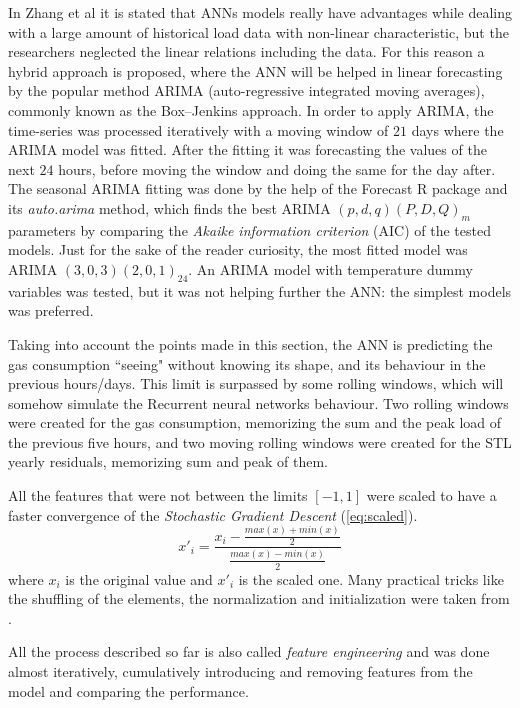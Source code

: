 \documentclass{sig-alternate-sigmod07}
\begin{document}
In Zhang et al \cite{zhang1998forecasting} it is stated that ANNs models really have advantages while dealing with a large amount of historical load data with non-linear characteristic, but the researchers neglected the linear relations including the data. For this reason a hybrid approach is proposed, where the ANN will be helped in linear forecasting by the popular method ARIMA (auto-regressive integrated moving averages), commonly known as the Box–Jenkins approach. In order to apply ARIMA, the time-series was processed iteratively with a moving window of $21$ days where the ARIMA model was fitted. After the fitting it was forecasting the values of the next $24$ hours, before moving the window and doing the same for the day after. The seasonal ARIMA fitting was done by the help of the Forecast R package \cite{hyndman2007automatic} and its \emph{auto.arima} method, which finds the best ARIMA $(p,d,q) (P,D,Q)_m$ parameters by comparing the \emph{Akaike information criterion} (AIC) of the tested models. Just for the sake of the reader curiosity, the most fitted model was ARIMA $(3,0,3) (2,0,1)_{24}$. An ARIMA model with temperature dummy variables was tested, but it was not helping further the ANN: the simplest models was preferred.

Taking into account the points made in this section, the ANN is predicting the gas consumption ``seeing" without knowing its shape, and its behaviour in the previous hours/days. This limit is surpassed by some rolling windows, which will somehow simulate the Recurrent neural networks behaviour. Two rolling windows were created for the gas consumption, memorizing the sum and the peak load of the previous five hours, and two moving rolling windows were created for the STL yearly residuals, memorizing sum and peak of them.

All the features that were not between the limits $[-1,1]$ were scaled to have a faster convergence \cite{lecun2012efficient} of the \emph{Stochastic Gradient Descent} (\cref{eq:scaled}).
\begin{equation}\label{eq:scaled}
x'_i=\frac{x_i -  \frac{max(x) + min(x)}{2}}{ \frac{max(x) - min(x)}{2}}\end{equation} where $x_i$ is the original value and $x'_i$ is the scaled one. Many practical tricks like the shuffling of the elements, the normalization and initialization were taken from \cite{lecun2012efficient, bottou2012stochastic}.

All the process described so far is also called \emph{feature engineering} and was done almost iteratively, cumulatively introducing and removing features from the model and comparing the performance.
\end{document}
